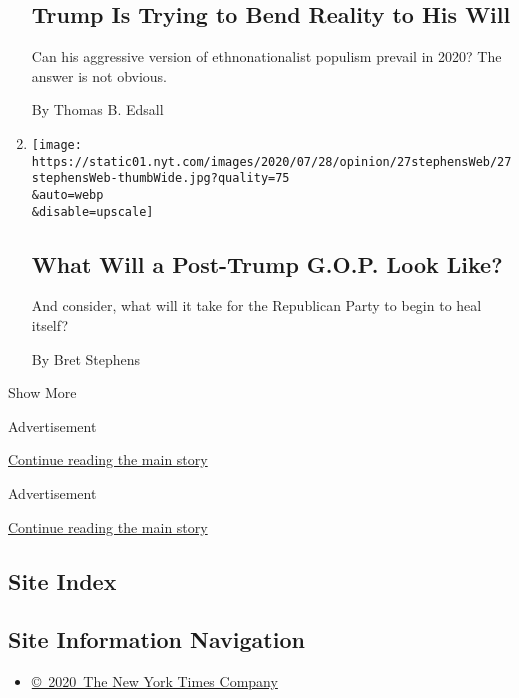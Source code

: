 \begin{enumerate}
{  \subsection{Trump Is Trying to Bend Reality to His
  Will}\label{trump-is-trying-to-bend-reality-to-his-will}}

  Can his aggressive version of ethnonationalist populism prevail in
  2020? The answer is not obvious.

  By Thomas B. Edsall
\item
  \href{/2020/07/27/opinion/trump-2020.html}{}

  \texttt{[image: https://static01.nyt.com/images/2020/07/28/opinion/27stephensWeb/27stephensWeb-thumbWide.jpg?quality=75\\\&auto=webp\\\&disable=upscale]}

  \hypertarget{what-will-a-post-trump-gop-look-like}{%
  \subsection{What Will a Post-Trump G.O.P. Look
  Like?}\label{what-will-a-post-trump-gop-look-like}}

  And consider, what will it take for the Republican Party to begin to
  heal itself?

  By Bret Stephens
\end{enumerate}

Show More

Advertisement

\protect\hyperlink{after-mid2}{Continue reading the main story}

Advertisement

\protect\hyperlink{after-mktg}{Continue reading the main story}

\hypertarget{site-index}{%
\subsection{Site Index}\label{site-index}}

\hypertarget{site-information-navigation}{%
\subsection{Site Information
Navigation}\label{site-information-navigation}}

\begin{itemize}
\tightlist
\item
  \href{https://help.nytimes.com/hc/en-us/articles/115014792127-Copyright-notice}{©~2020~The
  New York Times Company}
\end{itemize}


